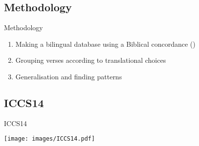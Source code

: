 \subsection{Methodology}

\begin{frame}{Methodology}
	\begin{enumerate}
		\item Making a bilingual database using a Biblical concordance (\cite{even-shoshan.a:1977:concordance})
		\item Grouping verses according to translational choices
		\item Generalisation and finding patterns
	\end{enumerate}
\end{frame}









\subsection{ICCS14}

\begin{frame}{ICCS14}
	\begin{center}
		\texttt{[image: images/ICCS14.pdf]}
	\end{center}
\end{frame}
